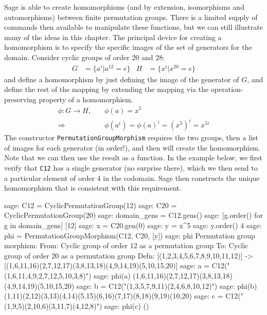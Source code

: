 Sage is able to create homomorphisms (and by extension, isomorphisms and automorphisms) between finite permutation groups.  There is a limited supply of commands then available to manipulate these functions, but we can still illustrate many of the ideas in this chapter.
%
%
The principal device for creating a homomorphism is to specify the specific images of the set of generators for the domain.  Consider cyclic groups of order 20 and 28:
%
\begin{align*}
G &= \{a^i\vert a^{12}=e\}
&
H &= \{x^i\vert x^{20}=e\}
\end{align*}
%
and define a homomorphism by just defining the image of the generator of $G$, and define the rest of the mapping by extending the mapping via the operation-preserving property of a homomorphism.
%
\begin{align*}
\phi: G\rightarrow H, &\quad\phi(a)=x^5\\
\Rightarrow           &\quad\phi(a^i) = \phi(a)^i = (x^5)^i = x ^{5i}
\end{align*}
%
The constructor \verb?PermutationGroupMorphism? requires the two groups, then a list of images for each generator (in order!), and then will create the homomorphism.  Note that we can then use the result as a function.  In the example below, we first verify that \verb?C12? has a single generator (no surprise there), which we then send to a particular element of order 4 in the codomain.  Sage then constructs the unique homomorphism that is consistent with this requirement.
%
\begin{sageexample}
sage: C12 = CyclicPermutationGroup(12)
sage: C20 = CyclicPermutationGroup(20)
sage: domain_gens = C12.gens()
sage: [g.order() for g in domain_gens]
[12]
sage: x = C20.gen(0)
sage: y = x^5
sage: y.order()
4
sage: phi = PermutationGroupMorphism(C12, C20, [y])
sage: phi
Permutation group morphism:
  From: Cyclic group of order 12 as a permutation group
  To:   Cyclic group of order 20 as a permutation group
  Defn: [(1,2,3,4,5,6,7,8,9,10,11,12)] ->
        [(1,6,11,16)(2,7,12,17)(3,8,13,18)(4,9,14,19)(5,10,15,20)]
sage: a = C12("(1,6,11,4,9,2,7,12,5,10,3,8)")
sage: phi(a)
(1,6,11,16)(2,7,12,17)(3,8,13,18)(4,9,14,19)(5,10,15,20)
sage: b = C12("(1,3,5,7,9,11)(2,4,6,8,10,12)")
sage: phi(b)
(1,11)(2,12)(3,13)(4,14)(5,15)(6,16)(7,17)(8,18)(9,19)(10,20)
sage: c = C12("(1,9,5)(2,10,6)(3,11,7)(4,12,8)")
sage: phi(c)
()
\end{sageexample}
